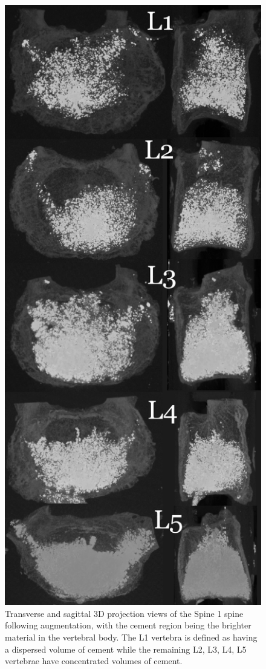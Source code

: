 \begin{figure}[ph!]
 \centering
 
\includegraphics[width=.65\textwidth]{Chapters/Chapter_HT_images/G17-11_projections}
	\caption{Transverse and sagittal 3D projection views of the Spine 1 spine
following augmentation, with the cement region being the brighter material in
the vertebral body. The L1 vertebra is defined as having a dispersed volume of
cement while the remaining L2, L3, L4, L5 vertebrae have concentrated volumes
of cement.}
  \label{fig:Spine 1_projection}
\end{figure}

